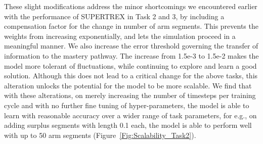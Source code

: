 These slight modifications address the minor shortcomings we encountered earlier with the performance of SUPERTREX in Task 2 and 3, by including a compensation factor for the change in number of arm segments. This prevents the weights from increasing exponentially, and lets the simulation proceed in a meaningful manner. We also increase the error threshold governing the transfer of information to the mastery pathway. The increase from 1.5e-3 to 1.5e-2 makes the model more tolerant of fluctuations, while continuing to explore and learn a good solution. Although this does not lead to a critical change for the above tasks, this alteration unlocks the potential for the model to be more scalable. We find that with these alterations, on merely increasing the number of timesteps per training cycle and with no further fine tuning of hyper-parameters, the model is able to learn with reasonable accuracy over a wider range of task parameters, for e.g., on adding surplus segments with length 0.1 each, the model is able to perform well with up to 50 arm segments  (Figure~\ref{Fig:Scalability_Task2}).







